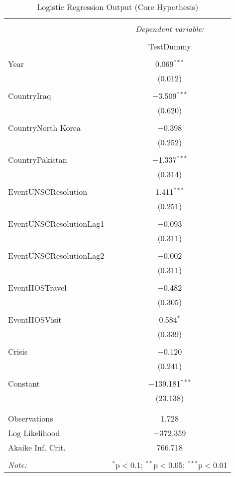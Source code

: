 \documentclass{article}
\begin{document}
\begin{table}[!htbp] \centering 
  \caption{Logistic Regression Output (Core Hypothesis)} 
  \label{} 
\begin{tabular}{@{\extracolsep{5pt}}lc} 
\\[-1.8ex]\hline 
\hline \\[-1.8ex] 
 & \multicolumn{1}{c}{\textit{Dependent variable:}} \\ 
\cline{2-2} 
\\[-1.8ex] & TestDummy \\ 
\hline \\[-1.8ex] 
 Year & 0.069$^{***}$ \\ 
  & (0.012) \\ 
  & \\ 
 CountryIraq & $-$3.509$^{***}$ \\ 
  & (0.620) \\ 
  & \\ 
 CountryNorth Korea & $-$0.398 \\ 
  & (0.252) \\ 
  & \\ 
 CountryPakistan & $-$1.337$^{***}$ \\ 
  & (0.314) \\ 
  & \\ 
 EventUNSCResolution & 1.411$^{***}$ \\ 
  & (0.251) \\ 
  & \\ 
 EventUNSCResolutionLag1 & $-$0.093 \\ 
  & (0.311) \\ 
  & \\ 
 EventUNSCResolutionLag2 & $-$0.002 \\ 
  & (0.311) \\ 
  & \\ 
 EventHOSTravel & $-$0.482 \\ 
  & (0.305) \\ 
  & \\ 
 EventHOSVisit & 0.584$^{*}$ \\ 
  & (0.339) \\ 
  & \\ 
 Crisis & $-$0.120 \\ 
  & (0.241) \\ 
  & \\ 
 Constant & $-$139.181$^{***}$ \\ 
  & (23.138) \\ 
  & \\ 
\hline \\[-1.8ex] 
Observations & 1,728 \\ 
Log Likelihood & $-$372.359 \\ 
Akaike Inf. Crit. & 766.718 \\ 
\hline 
\hline \\[-1.8ex] 
\textit{Note:}  & \multicolumn{1}{r}{$^{*}$p$<$0.1; $^{**}$p$<$0.05; $^{***}$p$<$0.01} \\ 
\end{tabular} 
\end{table} 
\end{document}
